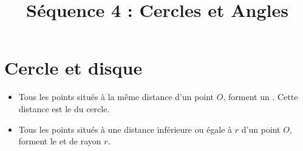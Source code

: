 \documentclass[xcolor={dvipsnames}]{beamer}
\title{Séquence 4 : Cercles et Angles}
\date{ }
\begin{document}
\begin{frame}
  \titlepage 
\end{frame}


\begin{frame}{}
	
\end{frame}

\section{Cercle et disque}


\begin{frame}
	\begin{mydefs}
		\begin{itemize}
			
			\item Tous les points situés à la même distance d'un point $O$, forment un . \pause Cette distance est le  du cercle. \pause
			\item Tous les points situés à une distance inférieure ou égale à $r$ d'un point $O$, \pause forment le  et de rayon $r$.
		\end{itemize}
	\end{mydefs}
\end{frame}
\end{document}

